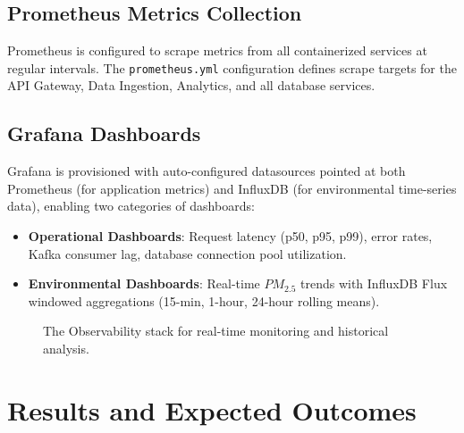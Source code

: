 \documentclass[12pt,a4paper]{article}
\begin{document}
\subsection{Prometheus Metrics Collection}
Prometheus is configured to scrape metrics from all containerized services at regular intervals. The \texttt{prometheus.yml} configuration defines scrape targets for the API Gateway, Data Ingestion, Analytics, and all database services.

\subsection{Grafana Dashboards}
Grafana is provisioned with auto-configured datasources pointed at both Prometheus (for application metrics) and InfluxDB (for environmental time-series data), enabling two categories of dashboards:

\begin{itemize}[nosep]
    \item \textbf{Operational Dashboards}: Request latency (p50, p95, p99), error rates, Kafka consumer lag, database connection pool utilization.
    \item \textbf{Environmental Dashboards}: Real-time $PM_{2.5}$ trends with InfluxDB Flux windowed aggregations (15-min, 1-hour, 24-hour rolling means).
\end{itemize}

\begin{figure}[H]
\centering
{}
\caption{The Observability stack for real-time monitoring and historical analysis.}
\label{fig:monitoring}
\end{figure}

\section{Results and Expected Outcomes}
\end{document}
